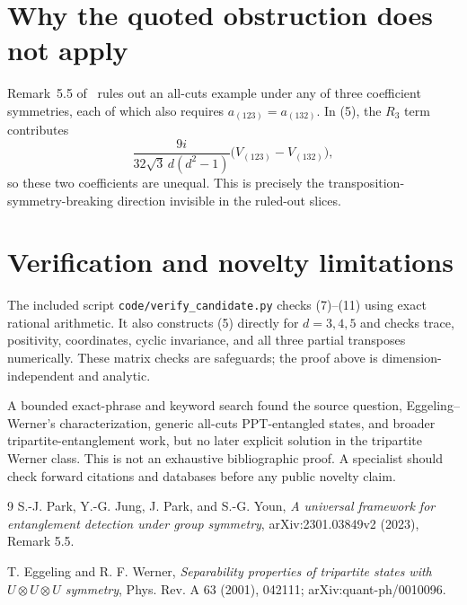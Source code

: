 \documentclass[11pt]{article}
\begin{document}
\section{Why the quoted obstruction does not apply}

Remark~5.5 of~\cite{PJYP} rules out an all-cuts example under any of three
coefficient symmetries, each of which also requires
$a_{(123)}=a_{(132)}$.  In (5), the $R_3$ term contributes
\[
 \frac{9i}{32\sqrt3\,d(d^2-1)}
 \bigl(V_{(123)}-V_{(132)}\bigr),
\]
so these two coefficients are unequal.  This is precisely the
transposition-symmetry-breaking direction invisible in the ruled-out slices.

\section{Verification and novelty limitations}

The included script \texttt{code/verify\_candidate.py} checks (7)--(11) using
exact rational arithmetic.  It also constructs (5) directly for $d=3,4,5$
and checks trace, positivity, coordinates, cyclic invariance, and all three
partial transposes numerically.  These matrix checks are safeguards; the proof
above is dimension-independent and analytic.

A bounded exact-phrase and keyword search found the source question,
Eggeling--Werner's characterization, generic all-cuts PPT-entangled states,
and broader tripartite-entanglement work, but no later explicit solution in the
tripartite Werner class.  This is not an exhaustive bibliographic proof.  A
specialist should check forward citations and databases before any public
novelty claim.

\begin{thebibliography}{9}
S.-J. Park, Y.-G. Jung, J. Park, and S.-G. Youn,
\emph{A universal framework for entanglement detection under group symmetry},
arXiv:2301.03849v2 (2023), Remark 5.5.

T. Eggeling and R. F. Werner,
\emph{Separability properties of tripartite states with
$U\otimes U\otimes U$ symmetry},
Phys. Rev. A 63 (2001), 042111; arXiv:quant-ph/0010096.
\end{thebibliography}
\end{document}
